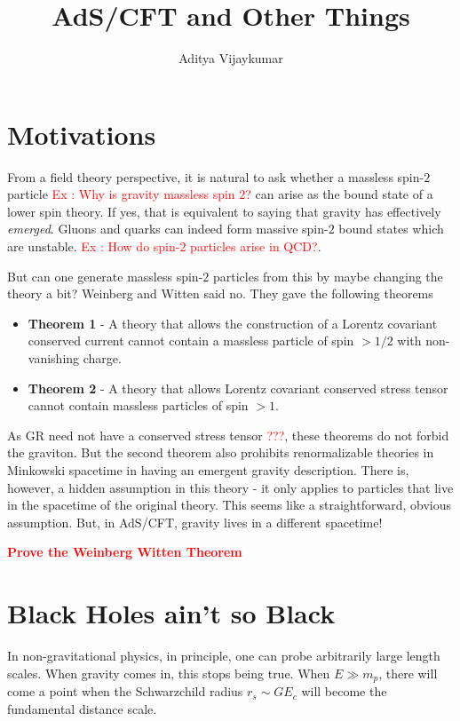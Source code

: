 \documentclass[a4paper,11pt]{article}
\title{\textbf{AdS/CFT and Other Things}}
\author{Aditya Vijaykumar}
\affiliation{International Centre for Theoretical Sciences, Bengaluru, India.}
\begin{document}
\maketitle
\section{Motivations}
From a field theory perspective, it is natural to ask whether a massless spin-$2$ particle \textcolor{red}{Ex : Why is gravity massless spin $ 2 $?} can arise as the bound state of a lower spin theory. If yes, that is equivalent to saying that gravity has effectively \textit{emerged}. Gluons and quarks can indeed form massive spin-$ 2 $ bound states which are unstable. \textcolor{red}{Ex : How do spin-$2$ particles arise in QCD?}.

But can one generate massless spin-$ 2 $ particles from this by maybe changing the theory a bit? Weinberg and Witten said no. They gave the following theorems

\begin{itemize}

\item \textbf{Theorem 1} - A theory that allows the construction of a Lorentz covariant conserved current cannot contain a massless particle of spin $  > 1/2 $ with non-vanishing charge.
\item \textbf{Theorem 2} - A theory that allows Lorentz covariant conserved stress tensor cannot contain massless particles of spin $ >1 $.
\end{itemize}
As GR need not have a conserved stress tensor \textcolor{red}{???}, these theorems do not forbid the graviton. But the second theorem also prohibits renormalizable theories in Minkowski spacetime in having an emergent gravity description. There is, however, a hidden assumption in this theory - it only applies to particles that live in the spacetime of the original theory. This seems like a straightforward, obvious assumption. But, in AdS/CFT, gravity lives in a different spacetime!

\textbf{\textcolor{red}{{Prove the Weinberg Witten Theorem}}}

\section{Black Holes ain't so Black}
In non-gravitational physics, in principle, one can probe arbitrarily large length scales. When gravity comes in, this stops being true. When $ E \gg m_p $, there will come a point when the Schwarzchild radius $ r_s \sim GE_{c} $ will become the fundamental distance scale. 
\end{document}
